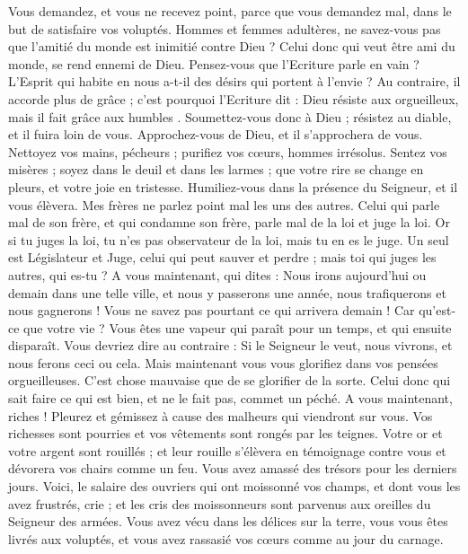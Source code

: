 \begin{multicols}{2}
Vous demandez, et vous ne recevez point, parce que vous demandez mal, dans le but de satisfaire vos voluptés.
Hommes et femmes adultères, ne savez-vous pas que l'amitié du monde est inimitié contre Dieu ? Celui donc qui veut être ami du monde, se rend ennemi de Dieu.
Pensez-vous que l'Ecriture parle en vain ? L'Esprit qui habite en nous a-t-il des désirs qui portent à l'envie ?
Au contraire, il accorde plus de grâce ; c'est pourquoi l'Ecriture dit : Dieu résiste aux orgueilleux, mais il fait grâce aux humbles{} .
Soumettez-vous donc à Dieu ; résistez au diable, et il fuira loin de vous.
Approchez-vous de Dieu, et il s'approchera de vous. Nettoyez vos mains, pécheurs ; purifiez vos cœurs, hommes irrésolus.
Sentez vos misères ; soyez dans le deuil et dans les larmes ; que votre rire se change en pleurs, et votre joie en tristesse.
Humiliez-vous dans la présence du Seigneur, et il vous élèvera.
Mes frères ne parlez point mal les uns des autres. Celui qui parle mal de son frère, et qui condamne son frère, parle mal de la loi et juge la loi. Or si tu juges la loi, tu n'es pas observateur de la loi, mais tu en es le juge.
Un seul est Législateur et Juge, celui qui peut sauver et perdre ; mais toi qui juges les autres, qui es-tu ?
A vous maintenant, qui dites : Nous irons aujourd'hui ou demain dans une telle ville, et nous y passerons une année, nous trafiquerons et nous gagnerons !
Vous ne savez pas pourtant ce qui arrivera demain ! Car qu’est-ce que votre vie ? Vous êtes une vapeur qui paraît pour un temps, et qui ensuite disparaît.
Vous devriez dire au contraire : Si le Seigneur le veut, nous vivrons, et nous ferons ceci ou cela.
Mais maintenant vous vous glorifiez dans vos pensées orgueilleuses. C’est chose mauvaise que de se glorifier de la sorte.
Celui donc qui sait faire ce qui est bien, et ne le fait pas, commet un péché.
\VerseOne{}A vous maintenant, riches ! Pleurez et gémissez à cause des malheurs qui viendront sur vous.
Vos richesses sont pourries et vos vêtements sont rongés par les teignes.
Votre or et votre argent sont rouillés ; et leur rouille s’élèvera en témoignage contre vous et dévorera vos chairs comme un feu. Vous avez amassé des trésors pour les derniers jours.
Voici, le salaire des ouvriers qui ont moissonné vos champs, et dont vous les avez frustrés, crie ; et les cris des moissonneurs sont parvenus aux oreilles du Seigneur des armées.
Vous avez vécu dans les délices sur la terre, vous vous êtes livrés aux voluptés, et vous avez rassasié vos cœurs comme au jour du carnage.

\end{multicols}
